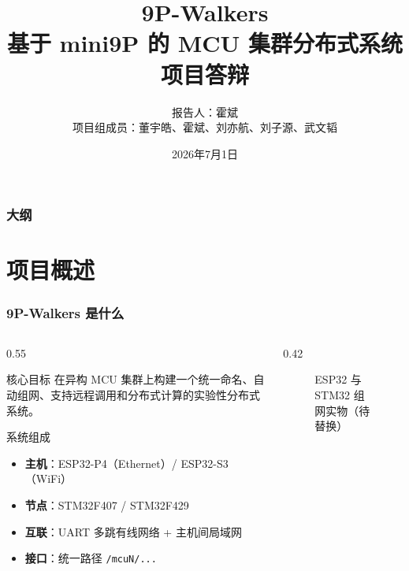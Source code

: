 \documentclass[aspectratio=169]{ctexbeamer}
\title[9P-Walkers 项目答辩]{
  9P-Walkers\\
  基于 mini9P 的 MCU 集群分布式系统\\
  项目答辩
}
\author[9P-Walkers]{
  报告人：霍斌\\
  项目组成员：董宇皓、霍斌、刘亦航、刘子源、武文韬
}
\institute[USTC]{
  中国科学技术大学\\
  OSH-2026 课程项目
}
\date{2026年7月1日}
\begin{document}
\maketitleframe

\begin{frame}
  \frametitle{大纲}
  \tableofcontents[hideallsubsections]
\end{frame}


\section{项目概述}

\begin{frame}
  \frametitle{9P-Walkers 是什么}
  \begin{columns}[T]
    \begin{column}{0.55\textwidth}
      \begin{block}{核心目标}
        \small
        在异构 MCU 集群上构建一个\alert{统一命名、自动组网、支持远程调用和分布式计算}的实验性分布式系统。
      \end{block}
      \begin{block}{系统组成}
        \small
        \begin{itemize}
          \item \textbf{主机}：ESP32-P4（Ethernet）/ ESP32-S3（WiFi）
          \item \textbf{节点}：STM32F407 / STM32F429
          \item \textbf{互联}：UART 多跳有线网络 + 主机间局域网
          \item \textbf{接口}：统一路径 \texttt{/mcuN/...}
        \end{itemize}
      \end{block}
    \end{column}
    \begin{column}{0.42\textwidth}
      \begin{figure}
        \centering
        \caption{ESP32 与 STM32 组网实物（待替换）}
      \end{figure}
    \end{column}
  \end{columns}
\end{frame}
\end{document}
